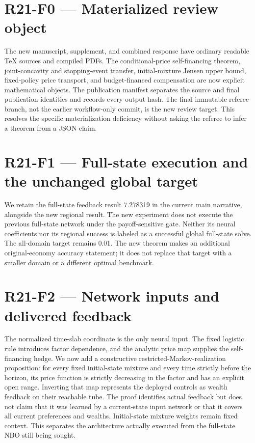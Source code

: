 \documentclass[ecta]{econsocart}
\theoremstyle{remark}
\begin{document}
\section{R21-F0 — Materialized review object}
The new manuscript, supplement, and combined response have ordinary readable TeX sources and compiled PDFs. The conditional-price self-financing theorem, joint-concavity and stopping-event transfer, initial-mixture Jensen upper bound, fixed-policy price transport, and budget-financed compensation are now explicit mathematical objects. The publication manifest separates the source and final publication identities and records every output hash. The final immutable referee branch, not the earlier workflow-only commit, is the new review target. This resolves the specific materialization deficiency without asking the referee to infer a theorem from a JSON claim.

\section{R21-F1 — Full-state execution and the unchanged global target}
We retain the full-state feedback result 7.278319 in the current main narrative, alongside the new regional result. The new experiment does not execute the previous full-state network under the payoff-sensitive gate. Neither its neural coefficients nor its regional success is labeled as a successful global full-state solve. The all-domain target remains 0.01. The new theorem makes an additional original-economy accuracy statement; it does not replace that target with a smaller domain or a different optimal benchmark.

\section{R21-F2 — Network inputs and delivered feedback}
The normalized time-slab coordinate is the only neural input. The fixed logistic rule introduces factor dependence, and the analytic price map supplies the self-financing hedge. We now add a constructive restricted-Markov-realization proposition: for every fixed initial-state mixture and every time strictly before the horizon, its price function is strictly decreasing in the factor and has an explicit open range. Inverting that map represents the deployed controls as wealth feedback on their reachable tube. The proof identifies actual feedback but does not claim that it was learned by a current-state input network or that it covers all current preferences and wealths. Initial-state mixture weights remain fixed context. This separates the architecture actually executed from the full-state NBO still being sought.
\end{document}
